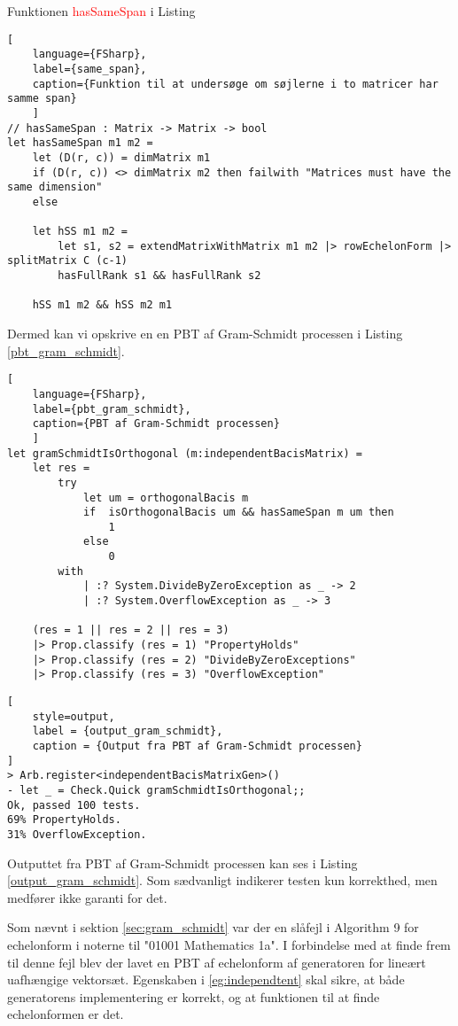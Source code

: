 Funktionen \textcolor{red}{hasSameSpan} i Listing 

\begin{lstlisting}[
    language={FSharp}, 
    label={same_span},
    caption={Funktion til at undersøge om søjlerne i to matricer har samme span}
    ]
// hasSameSpan : Matrix -> Matrix -> bool
let hasSameSpan m1 m2 = 
    let (D(r, c)) = dimMatrix m1
    if (D(r, c)) <> dimMatrix m2 then failwith "Matrices must have the same dimension"
    else
    
    let hSS m1 m2 =
        let s1, s2 = extendMatrixWithMatrix m1 m2 |> rowEchelonForm |> splitMatrix C (c-1)
        hasFullRank s1 && hasFullRank s2
    
    hSS m1 m2 && hSS m2 m1
\end{lstlisting}

Dermed kan vi opskrive en en PBT af Gram-Schmidt processen i Listing \ref{pbt_gram_schmidt}.


\begin{lstlisting}[
    language={FSharp}, 
    label={pbt_gram_schmidt}, 
    caption={PBT af Gram-Schmidt processen}
    ]
let gramSchmidtIsOrthogonal (m:independentBacisMatrix) =
    let res =
        try 
            let um = orthogonalBacis m
            if  isOrthogonalBacis um && hasSameSpan m um then 
                1 
            else 
                0
        with
            | :? System.DivideByZeroException as _ -> 2
            | :? System.OverflowException as _ -> 3

    (res = 1 || res = 2 || res = 3)
    |> Prop.classify (res = 1) "PropertyHolds"
    |> Prop.classify (res = 2) "DivideByZeroExceptions"
    |> Prop.classify (res = 3) "OverflowException"
\end{lstlisting}

\begin{lstlisting}[
    style=output,
    label = {output_gram_schmidt},
    caption = {Output fra PBT af Gram-Schmidt processen}
]
> Arb.register<independentBacisMatrixGen>()
- let _ = Check.Quick gramSchmidtIsOrthogonal;;
Ok, passed 100 tests.
69% PropertyHolds.
31% OverflowException.
\end{lstlisting}

Outputtet fra PBT af Gram-Schmidt processen kan ses i Listing \ref{output_gram_schmidt}. Som sædvanligt indikerer testen kun korrekthed, men medfører ikke garanti for det.

Som nævnt i sektion \ref{sec:gram_schmidt} var der en slåfejl i Algorithm 9 for echelonform i noterne til "01001 Mathematics 1a". I forbindelse med at finde frem til denne fejl blev der lavet en PBT af echelonform af generatoren for lineært uafhængige vektorsæt. Egenskaben i \ref{eg:independtent} skal sikre, at både generatorens implementering er korrekt, og at funktionen til at finde echelonformen er det.

